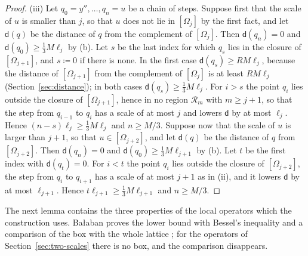 \documentclass[11pt]{preprint}
\numberwithin{equation}{section}
\theoremstyle{definition}
\theoremstyle{remark}
\theoremstyle{plain}
\begin{document}
\begin{proof}
(iii) Let $q_0 = y'', \dots, q_n = u$ be a chain of steps. Suppose first that the scale of $u$ is smaller than $j$, so that $u$ does not lie in $[\Omega_j]$ by the first fact, and let $\mathsf d(q)$ be the distance of $q$ from the complement of $[\Omega_j]$. Then $\mathsf d(q_n) = 0$ and $\mathsf d(q_0) \geq \frac13M\ell_j$ by (b). Let $s$ be the last index for which $q_s$ lies in the closure of $[\Omega_{j+1}]$, and $s \coloneqq 0$ if there is none. In the first case $\mathsf d(q_s) \geq RM\ell_j$, because the distance of $[\Omega_{j+1}]$ from the complement of $[\Omega_j]$ is at least $RM\ell_j$ (Section~\ref{sec:distance}); in both cases $\mathsf d(q_s) \geq \frac13M\ell_j$. For $i > s$ the point $q_i$ lies outside the closure of $[\Omega_{j+1}]$, hence in no region $\mathcal R_m$ with $m \geq j + 1$, so that the step from $q_{i-1}$ to $q_i$ has a scale of at most $j$ and lowers $\mathsf d$ by at most $\ell_j$. Hence $(n - s)\ell_j \geq \frac13M\ell_j$ and $n \geq M/3$. Suppose now that the scale of $u$ is larger than $j + 1$, so that $u \in [\Omega_{j+2}]$, and let $\mathsf d(q)$ be the distance of $q$ from $[\Omega_{j+2}]$. Then $\mathsf d(q_n) = 0$ and $\mathsf d(q_0) \geq \frac13M\ell_{j+1}$ by (b). Let $t$ be the first index with $\mathsf d(q_t) = 0$. For $i < t$ the point $q_i$ lies outside the closure of $[\Omega_{j+2}]$, the step from $q_i$ to $q_{i+1}$ has a scale of at most $j + 1$ as in (ii), and it lowers $\mathsf d$ by at most $\ell_{j+1}$. Hence $t\ell_{j+1} \geq \frac13M\ell_{j+1}$ and $n \geq M/3$.
\end{proof}

The next lemma contains the three properties of the local operators which the construction uses. Ba{\l}aban proves the lower bound \cite[(2.78)]{BalabanPRT2} with Bessel's inequality and a comparison of the box with the whole lattice \cite[(2.73), (2.74)]{BalabanPRT2}; for the operators of Section~\ref{sec:two-scales} there is no box, and the comparison disappears.
\end{document}
